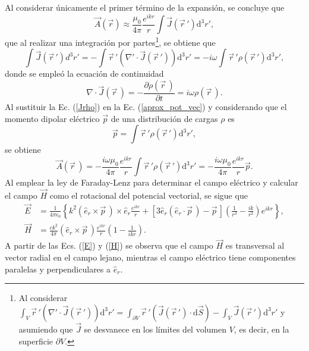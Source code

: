 Al considerar únicamente el primer término de la expansión, se concluye que 
\begin{equation}
    \Vec{A}(\Vec{r})\approx\frac{\mu_0}{4\pi}\frac{e^{ikr}}{r}\int \Vec{J}(\Vec{r}\,') \text{d}^3r',    
    \label{aprox_pot_vec}
\end{equation}
que al realizar una integración por partes\footnote{Al considerar $\int_V \Vec{r}\,'(\nabla'\cdot\Vec{J}(\Vec{r}\,'))\text{d}^3r'=\int_{\partial V} \Vec{r}\,'(\Vec{J}(\Vec{r}\,')\cdot \text{d}\Vec{S})-\int_V \Vec{J}(\Vec{r}\,')\text{d}^3r'$ y asumiendo que $\Vec{J}$ se desvanece en los límites del volumen $V$, es decir, en la superficie $\partial V$. }, se obtiene que
\begin{equation}
	\int\Vec{J}(\vec{r}\,')d^3r'=-\int \Vec{r}\,'(\nabla'\cdot\Vec{J}(\vec{r}\,'))\text{d}^3r'=-i\omega\int \Vec{r}\,'\rho(\Vec{r}\,')\text{d}^3r',
	\label{Jrho}
\end{equation}
donde se empleó la ecuación de continuidad
\begin{equation*}
    \nabla\cdot\Vec{J}(\Vec{r}\,)=-\frac{\partial\rho(\Vec{r}\,)}{\partial t}=i\omega\rho(\Vec{r}\,). 
\end{equation*}
Al sustituir la Ec. (\ref{Jrho}) en la Ec. (\ref{aprox_pot_vec}) y considerando que el momento dipolar eléctrico $\Vec{p}$ de una distribución de cargas $\rho$ es
\begin{equation*}
	\Vec{p}=\int \Vec{r}\,'\rho(\Vec{r}\,')\text{d}^3r',
\end{equation*}
se obtiene \cite{Jackson}
\begin{equation}
    \Vec{A}(\Vec{r}\,)=-\frac{i\omega\mu_0}{4\pi}\frac{e^{ikr}}{r}\int \Vec{r}\,'\rho(\Vec{r}\,')\text{d}^3r'=-\frac{i\omega\mu_0}{4\pi}\frac{e^{ikr}}{r}\Vec{p}. 
    \label{A_dip}  
\end{equation}
Al emplear la ley de Faraday-Lenz para determinar el campo eléctrico y calcular el campo $\Vec{H}$ como el rotacional del potencial vectorial, se sigue que \cite{Jackson}
\begin{align}
	\Vec{E}&=\frac{1}{4\pi\epsilon_0}\left\{k^2(\hat{e}_r\times\Vec{p}\,)\times\hat{e}_r\frac{e^{ikr}}{r}+[3\hat{e}_r(\hat{e}_r\cdot\Vec{p}\,)-\Vec{p}\,]\left(\frac{1}{r^3}-\frac{ik}{r^2}\right)e^{ikr}\right\},\label{E}\\
    \Vec{H}&=\frac{ck^2}{4\pi}(\hat{e}_r\times\Vec{p}\,)\frac{e^{ikr}}{r}\left(1-\frac{1}{ikr}\right).    \label{H}
\end{align}
A partir de las Ecs. (\ref{E})  y (\ref{H}) se observa que el campo $\Vec{H}$ es transversal al vector radial en el campo lejano, mientras el campo eléctrico tiene componentes paralelas y perpendiculares a $\hat{e}_r$.\\ 

